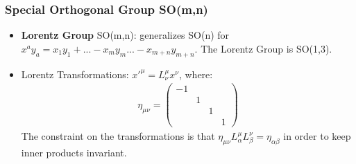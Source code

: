 \subsubsection{Special Orthogonal Group SO(m,n)} %
\begin{itemize}
    \item \textbf{Lorentz Group} SO(m,n): generalizes SO(n) for $x^ay_a=x_1y_1+...-x_my_m...-x_{m+n}y_{m+n}$. The Lorentz Group is SO(1,3). \cite{robinson}
    \item Lorentz Transformations: $x'^\mu=L^\mu_\nu x^\nu$, where: \cite{robinson}
    \begin{equation}\begin{split}
    \eta_{\mu\nu}=\begin{pmatrix}-1&&&\\&1&&\\&&1&\\&&&1\end{pmatrix}
    \end{split}\end{equation}
    The constraint on the transformations is that $\eta_{\mu\nu}L^\mu_\alpha L^\nu_\beta=\eta_{\alpha\beta}$ in order to keep inner products invariant.
\end{itemize}

